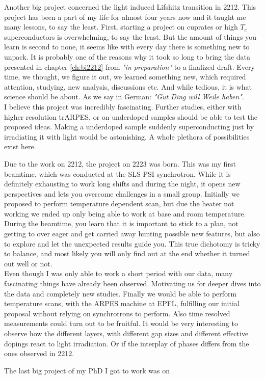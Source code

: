 \newpage

Another big project concerned the light induced Lifshitz transition in 2212.
This project has been a part of my life for almost four years now and it taught me many lessons, to say the least.
First, starting a project on cuprates or high $T_c$ superconductors is overwhelming, to say the least.
But the amount of things you learn is second to none, it seems like with every day there is something new to unpack.
It is probably one of the reasons why it took so long to bring the data presented in chapter \ref{ch:bi2212} from \textit{"in preparation"} to a finalized draft.
Every time, we thought, we figure it out, we learned something new, which required attention, studying, new analysis, discussions etc.
And while tedious, it is what science should be about.
As we say in German: \textit{"Gut Ding will Weile haben"}.\\
I believe this project was incredibly fascinating.
Further studies, either with higher resolution trARPES, or on underdoped samples should be able to test the proposed ideas.
Making a underdoped sample suddenly superconducting just by irradiating it with light would be astonishing.
A whole plethora of possibilities exist here.\hfill\break

Due to the work on 2212, the project on 2223 was born.
This was my first beamtime, which was conducted at the SLS PSI synchrotron.
While it is definitely exhausting to work long shifts and during the night, it opens new perspectives and lets you overcome challenges in a small group.
Initially we proposed to perform temperature dependent scan, but due the heater not working we ended up only being able to work at base and room temperature.
During the beamtime, you learn that it is important to stick to a plan, not getting to over eager and get carried away hunting possible new features, but also to explore and let the unexpected results guide you.
This true dichotomy is tricky to balance, and most likely you will only find out at the end whether it turned out well or not.\\
Even though I was only able to work a short period with our data, many fascinating things have already been observed.
Motivating us for deeper dives into the data and completely new studies.
Finally we would be able to perform temperature scans, with the ARPES machine at EPFL, fulfilling our initial proposal without relying on synchrotrons to perform.
Also time resolved measurements could turn out to be fruitful.
It would be very interesting to observe how the different layers, with different gap sizes and different effective dopings react to light irradiation.
Or if the interplay of phases differs from the ones observed in 2212. \hfill\break

The last big project of my PhD I got to work was on .
